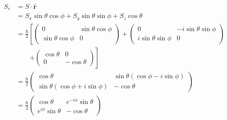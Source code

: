 \documentclass{article}
\renewcommand{\vec}[1]{\boldsymbol{\mathbf{#1}}}
\newcommand{\uvec}[1]{\hat{\vec{#1}}}
\begin{document}
\subsection{}

\begin{align*}
  S_r & = S \cdot \uvec{r}                                                                              \\
      & = S_x \sin \theta \cos \phi + S_y \sin \theta \sin \phi + S_z \cos \theta                       \\
      & = \frac{\hbar}{2} \left[ \begin{pmatrix}
                                     0                     & \sin \theta \cos \phi \\
                                     \sin \theta \cos \phi & 0
                                   \end{pmatrix} + \begin{pmatrix}
                                                     0                       & -i \sin \theta \sin \phi \\
                                                     i \sin \theta \sin \phi & 0
                                                   \end{pmatrix} \right.     \\
      & \qquad \left. + \begin{pmatrix}
                            \cos \theta & 0            \\
                            0           & -\cos \theta
                          \end{pmatrix} \right]                                                      \\
      & = \frac{\hbar}{2} \begin{pmatrix}
                            \cos \theta                           & \sin \theta (\cos \phi - i \sin \phi) \\
                            \sin \theta (\cos \phi + i \sin \phi) & -\cos \theta
                          \end{pmatrix} \\
      & = \frac{\hbar}{2} \begin{pmatrix}
                            \cos \theta            & e^{-i \phi} \sin \theta \\
                            e^{i \phi} \sin \theta & -\cos \theta
                          \end{pmatrix}
\end{align*}
\end{document}
